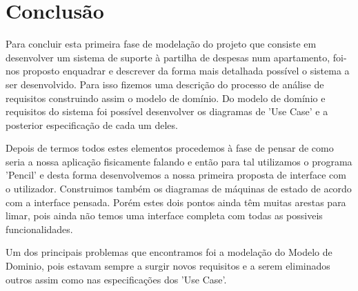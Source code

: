 \chapter{Conclusão}

Para concluir esta primeira fase de modelação do projeto que consiste em  desenvolver um sistema de suporte à partilha de despesas num apartamento, foi-nos proposto enquadrar e descrever da forma mais detalhada possível o sistema a ser desenvolvido. Para isso fizemos uma descrição do processo de análise de requisitos construindo assim o modelo de domínio.  Do modelo de domínio e requisitos do sistema foi possível desenvolver os diagramas de 'Use Case' e a posterior especificação de cada um deles. 

Depois de termos todos estes elementos procedemos à fase de pensar de como seria a nossa aplicação fisicamente falando e então para tal utilizamos o programa 'Pencil' e desta forma desenvolvemos a nossa primeira proposta de interface com o utilizador. Construimos também os diagramas de máquinas de estado de acordo com a interface pensada. Porém estes dois pontos ainda têm muitas arestas para limar, pois ainda não temos uma interface completa com todas as possiveis funcionalidades. 

Um dos principais problemas que encontramos foi a modelação do Modelo de Dominio, pois estavam sempre a surgir novos requisitos e a serem eliminados outros assim como nas especificações dos 'Use Case'. 





